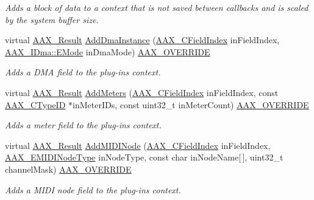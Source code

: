 \begin{DoxyCompactItemize}
\begin{DoxyCompactList}\small\item\em Adds a block of data to a context that is not saved between callbacks and is scaled by the system buffer size. \end{DoxyCompactList}\item 
virtual \hyperlink{a00149_a4d8f69a697df7f70c3a8e9b8ee130d2f}{A\+A\+X\+\_\+\+Result} \hyperlink{a00131_ac69904682c787e0c431dcef61539e017}{Add\+Dma\+Instance} (\hyperlink{a00149_ae807f8986143820cfb5d6da32165c9c7}{A\+A\+X\+\_\+\+C\+Field\+Index} in\+Field\+Index, \hyperlink{a00095_af8d0f19f2896dd6dbd126b919b24e39b}{A\+A\+X\+\_\+\+I\+Dma\+::\+E\+Mode} in\+Dma\+Mode) \hyperlink{a00149_ac2f24a5172689ae684344abdcce55463}{A\+A\+X\+\_\+\+O\+V\+E\+R\+R\+I\+D\+E}
\begin{DoxyCompactList}\small\item\em Adds a D\+M\+A field to the plug-\/in\textquotesingle{}s context. \end{DoxyCompactList}\item 
virtual \hyperlink{a00149_a4d8f69a697df7f70c3a8e9b8ee130d2f}{A\+A\+X\+\_\+\+Result} \hyperlink{a00131_a5403c1539bdb7de61b4bb4b583d5b35f}{Add\+Meters} (\hyperlink{a00149_ae807f8986143820cfb5d6da32165c9c7}{A\+A\+X\+\_\+\+C\+Field\+Index} in\+Field\+Index, const \hyperlink{a00149_ac678f9c1fbcc26315d209f71a147a175}{A\+A\+X\+\_\+\+C\+Type\+I\+D} $\ast$in\+Meter\+I\+Ds, const uint32\+\_\+t in\+Meter\+Count) \hyperlink{a00149_ac2f24a5172689ae684344abdcce55463}{A\+A\+X\+\_\+\+O\+V\+E\+R\+R\+I\+D\+E}
\begin{DoxyCompactList}\small\item\em Adds a meter field to the plug-\/in\textquotesingle{}s context. \end{DoxyCompactList}\item 
virtual \hyperlink{a00149_a4d8f69a697df7f70c3a8e9b8ee130d2f}{A\+A\+X\+\_\+\+Result} \hyperlink{a00131_ab5edc6afb89d171d6d1af8e921868cee}{Add\+M\+I\+D\+I\+Node} (\hyperlink{a00149_ae807f8986143820cfb5d6da32165c9c7}{A\+A\+X\+\_\+\+C\+Field\+Index} in\+Field\+Index, \hyperlink{a00206_a5e1dffce35d05990dbbad651702678e4}{A\+A\+X\+\_\+\+E\+M\+I\+D\+I\+Node\+Type} in\+Node\+Type, const char in\+Node\+Name\mbox{[}$\,$\mbox{]}, uint32\+\_\+t channel\+Mask) \hyperlink{a00149_ac2f24a5172689ae684344abdcce55463}{A\+A\+X\+\_\+\+O\+V\+E\+R\+R\+I\+D\+E}
\begin{DoxyCompactList}\small\item\em Adds a M\+I\+D\+I node field to the plug-\/in\textquotesingle{}s context. \end{DoxyCompactList}\item 

\end{DoxyCompactItemize}
